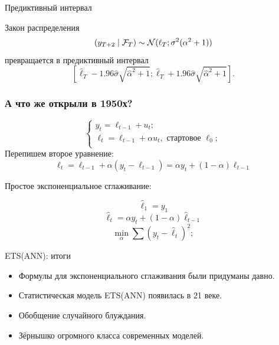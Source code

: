 \begin{frame}{Предиктивный интервал}

  Закон распределения
  \[
    (y_{T+2} \mid \mathcal F_T) \sim \mathcal{N}(\ell_T; \sigma^2(\alpha^2 + 1))
  \]
  превращается в \pause \alert{предиктивный интервал}
  \[
  [\hat\ell_T - 1.96 \hat\sigma \sqrt{\hat\alpha^2 + 1}; \hat \ell_T + 1.96 \hat\sigma \sqrt{\hat\alpha^2 + 1}].
  \]
\end{frame}


\begin{frame}
  \frametitle{А что же открыли в 1950х?}

  \[
    \begin{cases}
     y_t = \ell_{t-1} + u_t;\\
    \ell_t = \ell_{t-1} + \alpha u_t, \text{ стартовое } \ell_0; \\
    \end{cases}
  \]  
  \pause 
  Перепишем второе уравнение:
  \[
  \ell_t = \ell_{t-1} + \alpha (y_t - \ell_{t-1}) = \alpha y_t + (1 - \alpha) \ell_{t-1}  
  \]

  \pause
  \alert{Простое экспоненциальное сглаживание}:

  \[
  \hat\ell_1 = y_1
  \]
  \pause
  \[
  \hat \ell_t = \alpha y_t + (1-\alpha) \hat \ell_{t-1}
  \]
  \pause
  \[
  \min_{\alpha} \sum (y_t - \hat \ell_t)^2;  
  \]
  
\end{frame}


\begin{frame}{ETS(ANN): итоги}

  \begin{itemize}[<+->]
    \item Формулы для \alert{экспоненциального сглаживания} были придуманы давно.
    \item Статистическая \alert{модель} ETS(ANN) появилась в 21 веке.
    \item Обобщение случайного блуждания. 
    \item \alert{Зёрнышко} огромного класса современных моделей.
  \end{itemize}
\end{frame}

